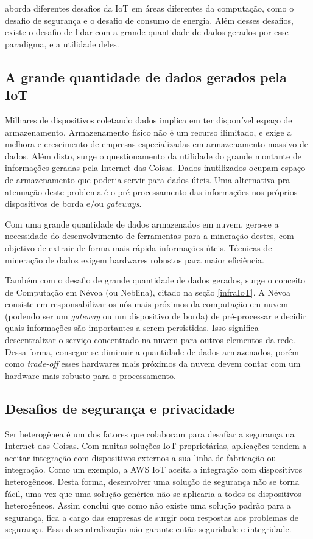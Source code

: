 \documentclass[
    hidelinks,
	12pt,				%
	openany,
	oneside, 
	a4paper,			%
	english,			%
	french,				%
	spanish,			%
	brazil				%
	]{abntex2}
\begin{document}
\cite{ray2016introIoT} aborda diferentes desafios da IoT em áreas diferentes da computação, como o desafio de segurança e o desafio de consumo de energia. Além desses desafios, existe o desafio de lidar com a grande quantidade de dados gerados por esse paradigma, e a utilidade deles.

\subsection{A grande quantidade de dados gerados pela IoT}

Milhares de dispositivos coletando dados implica em ter disponível espaço de armazenamento. Armazenamento físico não é um recurso ilimitado, e exige a melhora e crescimento de empresas especializadas em armazenamento massivo de dados. Além disto, surge o questionamento da utilidade do grande montante de informações geradas pela Internet das Coisas. Dados inutilizados ocupam espaço de armazenamento que poderia servir para dados úteis. Uma alternativa pra atenuação deste problema é o pré-processamento das informações nos próprios dispositivos de borda e/ou \textit{gateways}. 

Com uma grande quantidade de dados armazenados em nuvem, gera-se a necessidade do desenvolvimento de ferramentas para a mineração destes, com objetivo de extrair de forma mais rápida informações úteis. Técnicas de mineração de dados exigem hardwares robustos para maior eficiência.

Também com o desafio de grande quantidade de dados gerados, surge o conceito de Computação em Névoa (ou Neblina), citado na seção \ref{infraIoT}. A Névoa consiste em responsabilizar os nós mais próximos da computação em nuvem (podendo ser um \textit{gateway} ou um dispositivo de borda) de pré-processar e decidir quais informações são importantes a serem persistidas. Isso significa descentralizar o serviço concentrado na nuvem para outros elementos da rede. Dessa forma, consegue-se diminuir a quantidade de dados armazenados, porém como \textit{trade-off} esses hardwares mais próximos da nuvem devem contar com um hardware mais robusto para o processamento.

\subsection{Desafios de segurança e privacidade}

Ser heterogênea é um dos fatores que colaboram para desafiar a segurança na Internet das Coisas. Com muitas soluções IoT proprietárias, aplicações tendem a aceitar integração com dispositivos externos a sua linha de fabricação ou integração. Como um exemplo, a AWS IoT aceita a integração com dispositivos heterogêneos. Desta forma, desenvolver uma solução de segurança não se torna fácil, uma vez que uma solução genérica não se aplicaria a todos os dispositivos heterogêneos. Assim \cite{ray2016introIoT} conclui que como não existe uma solução padrão para a segurança, fica a cargo das empresas de surgir com respostas aos problemas de segurança. Essa descentralização não garante então seguridade e integridade.
\end{document}
